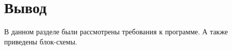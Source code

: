 \newpage

\begin{figure}[ht!]
\end{figure}

\newpage

\section{Вывод}

В данном разделе были рассмотрены требования к программе. 
А также приведены блок-схемы.






